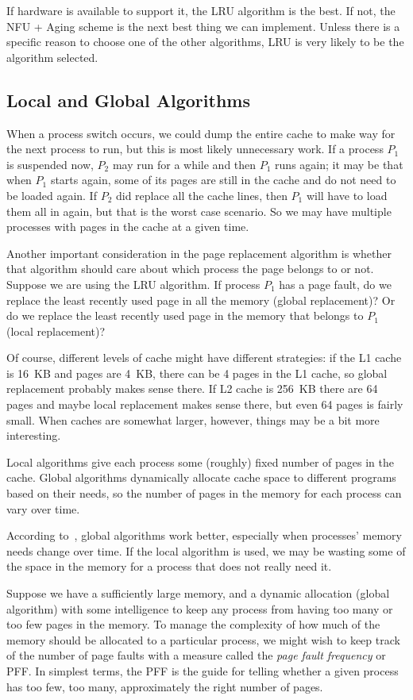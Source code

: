 If hardware is available to support it, the LRU algorithm is the best. If not, the NFU + Aging scheme is the next best thing we can implement. Unless there is a specific reason to choose one of the other algorithms, LRU is very likely to be the algorithm selected.

\subsection*{Local and Global Algorithms}
When a process switch occurs, we could dump the entire cache to make way for the next process to run, but this is most likely unnecessary work. If a process $P_{1}$ is suspended now, $P_{2}$ may run for a while and then $P_{1}$ runs again; it may be that when $P_{1}$ starts again, some of its pages are still in the cache and do not need to be loaded again. If $P_{2}$ did replace all the cache lines, then $P_{1}$ will have to load them all in again, but that is the worst case scenario. So we may have multiple processes with pages in the cache at a given time.

Another important consideration in the page replacement algorithm is whether that algorithm should care about which process the page belongs to or not. Suppose we are using the LRU algorithm. If process $P_{1}$ has a page fault, do we replace the least recently used page in all the memory (global replacement)? Or do we replace the least recently used page in the memory that belongs to $P_{1}$ (local replacement)?

Of course, different levels of cache might have different strategies: if the L1 cache is 16~KB and pages are 4~KB, there can be 4 pages in the L1 cache, so global replacement probably makes sense there. If L2 cache is 256~KB there are 64 pages and maybe local replacement makes sense there, but even 64 pages is fairly small. When caches are somewhat larger, however, things may be a bit more interesting.

Local algorithms give each process some (roughly) fixed number of pages in the cache. Global algorithms dynamically allocate cache space to different programs based on their needs, so the number of pages in the memory for each process can vary over time.

According to~\cite{mos}, global algorithms work better, especially when processes' memory needs change over time. If the local algorithm is used, we may be wasting some of the space in the memory for a process that does not really need it.

Suppose we have a sufficiently large memory, and a dynamic allocation (global algorithm) with some intelligence to keep any process from having too many or too few pages in the memory. To manage the complexity of how much of the memory should be allocated to a particular process, we might wish to keep track of the number of page faults with a measure called the \textit{page fault frequency} or PFF. In simplest terms, the PFF is the guide for telling whether a given process has too few, too many, approximately the right number of pages.

